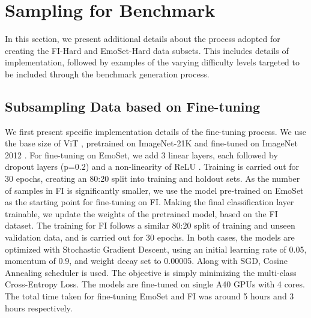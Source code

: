 \newpage
\section{Sampling for Benchmark}

In this section, we present additional details about the process adopted for creating the FI-Hard and EmoSet-Hard data subsets. This includes details of implementation, followed by examples of the varying difficulty levels targeted to be included through the benchmark generation process. 

\subsection{Subsampling Data based on Fine-tuning}
\label{app:finetune_vit_impl}

We first present specific implementation details of the fine-tuning process. We use the base size of ViT \cite{dosovitskiy2020vit}, pretrained on ImageNet-21K \cite{ridnik2021imagenet} and fine-tuned on ImageNet 2012 \cite{russakovsky2015imagenet}. For fine-tuning on EmoSet, we add 3 linear layers, each followed by dropout layers (p=0.2) and a non-linearity of ReLU \cite{nair2010rectified}. Training is carried out for 30 epochs, creating an 80:20 split into training and holdout sets. As the number of samples in FI is significantly smaller, we use the model pre-trained on EmoSet as the starting point for fine-tuning on FI. Making the final classification layer trainable, we update the weights of the pretrained model, based on the FI dataset. The training for FI follows a similar 80:20 split of training and unseen validation data, and is carried out for 30 epochs. In both cases, the models are optimized with Stochastic Gradient Descent, using an initial learning rate of 0.05, momentum of 0.9, and weight decay set to 0.00005. Along with SGD, Cosine Annealing scheduler is used. The objective is simply minimizing the multi-class Cross-Entropy Loss. The models are fine-tuned on single A40 GPUs with 4 cores. The total time taken for fine-tuning EmoSet and FI was around 5 hours and 3 hours respectively. 

\begin{table}[t]
\small
    \centering
    \caption{The final number of images in each of datasets used in our benchmark and evaluation experiments.}
    \label{tab:data_stats}
\end{table}


